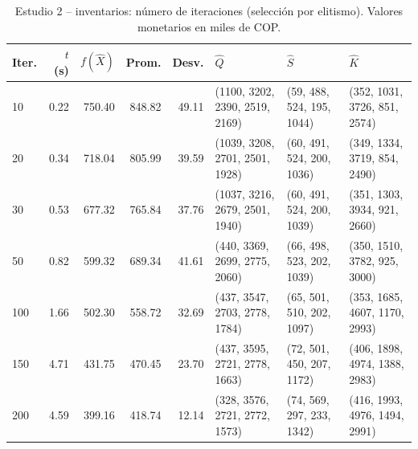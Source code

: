 \begin{table}[!t]
\centering
\scriptsize
\setlength{\tabcolsep}{3pt}
\caption{Estudio 2 -- inventarios: n\'umero de iteraciones (selecci\'on por elitismo). Valores monetarios en miles de COP.}
\label{tab:t2i}
\begin{tabular}{lrrrrlll}
\hline
Iter. & $t$ (s) & $f(\hat{X})$ & Prom. & Desv. & $\hat{Q}$ & $\hat{S}$ & $\hat{K}$ \\
\hline
10 & 0.22 & 750.40 & 848.82 & 49.11 & (1100, 3202, 2390, 2519, 2169) & (59, 488, 524, 195, 1044) & (352, 1031, 3726, 851, 2574) \\
20 & 0.34 & 718.04 & 805.99 & 39.59 & (1039, 3208, 2701, 2501, 1928) & (60, 491, 524, 200, 1036) & (349, 1334, 3719, 854, 2490) \\
30 & 0.53 & 677.32 & 765.84 & 37.76 & (1037, 3216, 2679, 2501, 1940) & (60, 491, 524, 200, 1039) & (351, 1303, 3934, 921, 2660) \\
50 & 0.82 & 599.32 & 689.34 & 41.61 & (440, 3369, 2699, 2775, 2060) & (66, 498, 523, 202, 1039) & (350, 1510, 3782, 925, 3000) \\
100 & 1.66 & 502.30 & 558.72 & 32.69 & (437, 3547, 2703, 2778, 1784) & (65, 501, 510, 202, 1097) & (353, 1685, 4607, 1170, 2993) \\
150 & 4.71 & 431.75 & 470.45 & 23.70 & (437, 3595, 2721, 2778, 1663) & (72, 501, 450, 207, 1172) & (406, 1898, 4974, 1388, 2983) \\
200 & 4.59 & 399.16 & 418.74 & 12.14 & (328, 3576, 2721, 2772, 1573) & (74, 569, 297, 233, 1342) & (416, 1993, 4976, 1494, 2991) \\
\hline
\end{tabular}
\end{table}
